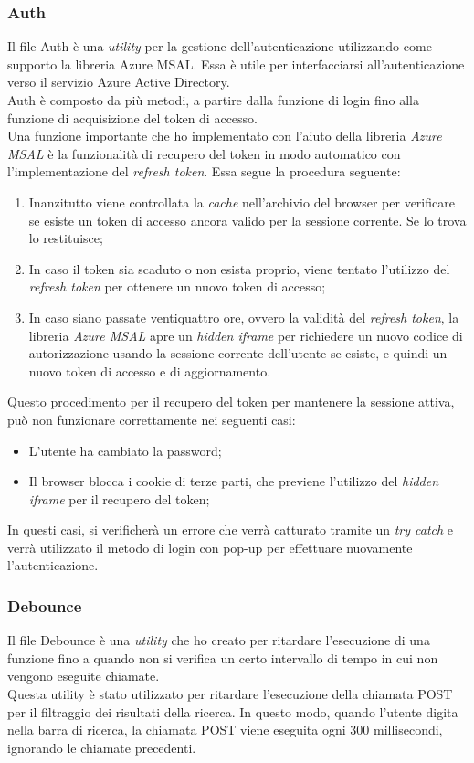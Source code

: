 \subsubsection{Auth}\label{subsubsec:auth-utils}
Il file Auth è una \textit{utility} per la gestione dell'autenticazione utilizzando come supporto la libreria Azure MSAL. Essa è utile
per interfacciarsi all'autenticazione verso il servizio Azure Active Directory.\\
Auth è composto da più metodi, a partire dalla funzione di login fino alla funzione di acquisizione del token di accesso.\\
Una funzione importante che ho implementato con l'aiuto della libreria \textit{Azure MSAL} è la funzionalità di recupero del token in modo automatico con 
l'implementazione del \textit{refresh token}. Essa segue la procedura seguente:
\begin{enumerate}
  \item Inanzitutto viene controllata la \textit{cache} nell'archivio del browser per verificare se esiste un token di accesso ancora valido per la sessione corrente. Se lo trova lo restituisce;
  \item In caso il token sia scaduto o non esista proprio, viene tentato l'utilizzo del \textit{refresh token} per ottenere un nuovo token di accesso;
  \item In caso siano passate ventiquattro ore, ovvero la validità del \textit{refresh token}, la libreria \textit{Azure MSAL} apre un \textit{hidden iframe} per richiedere
  un nuovo codice di autorizzazione usando la sessione corrente dell'utente se esiste, e quindi un nuovo token di accesso e di aggiornamento. 
\end{enumerate}
Questo procedimento per il recupero del token per mantenere la sessione attiva, può non funzionare correttamente nei seguenti casi:
\begin{itemize}
  \item L'utente ha cambiato la password;
  \item Il browser blocca i cookie di terze parti, che previene l'utilizzo del \textit{hidden iframe} per il recupero del token;
\end{itemize}
In questi casi, si verificherà un errore che verrà catturato tramite un \textit{try catch} e verrà utilizzato il metodo di login con pop-up per effettuare nuovamente l'autenticazione.
\subsubsection{Debounce}\label{subsubsec:debounce}
Il file Debounce è una \textit{utility} che ho creato per ritardare l'esecuzione di una funzione fino a quando non si verifica
un certo intervallo di tempo in cui non vengono eseguite chiamate.\\
Questa utility è stato utilizzato per ritardare l'esecuzione della chiamata POST per il filtraggio dei risultati della ricerca. 
In questo modo, quando l'utente digita nella barra di ricerca, la chiamata POST viene eseguita ogni 300 millisecondi, ignorando le chiamate precedenti.

